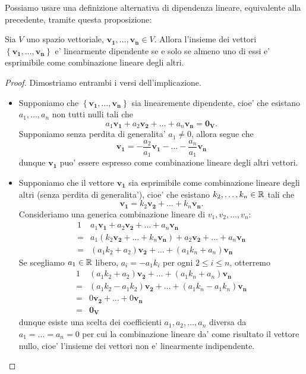 Possiamo usare una definizione alternativa di dipendenza lineare, equivalente alla precedente, tramite questa proposizione:
\begin{proposition}\label{dip_se_e'_comb_lin}
    Sia $V$ uno spazio vettoriale, $\bm{v_1}, \dots, \bm{v_n} \in V$. Allora l'insieme dei vettori $\left\{ \bm{v_1}, \dots, \bm{v_n} \right\}$ e' linearmente dipendente se e solo se almeno uno di essi e' esprimibile come combinazione lineare degli altri. 
\end{proposition}
\begin{proof}
    Dimostriamo entrambi i versi dell'implicazione.
    \begin{itemize}
        \item Supponiamo che $\left\{ \bm{v_1}, \dots, \bm{v_n} \right\}$ sia linearemente dipendente, cioe' che esistano $a_1, \dots, a_n$ non tutti nulli tali che \[
            a_1\bm{v_1} + a_2\bm{v_2} + \dots + a_n\bm{v_n} = \bm{0_V}   
        .\]
        Supponiamo senza perdita di generalita' $a_1 \neq 0$, allora segue che \[
            \bm{v_1} = -\frac{a_2}{a_1}\bm{v_1} - \dots - \frac{a_n}{a_1}\bm{v_n}
        \]
        dunque $\bm{v_1}$ puo' essere espresso come combinazione lineare degli altri vettori.
        \item Supponiamo che il vettore $\bm{v_1}$ sia esprimibile come combinazione lineare degli altri (senza perdita di generalita'), cioe' che esistano $k_2, \dots, k_n \in \mathbb{R}$ tali che \[
            \bm{v_1} = k_2\bm{v_2} + \dots + k_n\bm{v_n}
        .\]
        Consideriamo una generica combinazione lineare di $v_1, v_2, \dots, v_n$:
        \begin{alignat*}
            {1}
            & a_1\bm{v_1} + a_2\bm{v_2} + \dots + a_n\bm{v_n} \\
            = & a_1(k_2\bm{v_2} + \dots + k_n\bm{v_n}) + a_2\bm{v_2} + \dots + a_n\bm{v_n} \\
            = & (a_1k_2 + a_2)\bm{v_2} + \dots + (a_1k_n + a_n)\bm{v_n}
        \end{alignat*}
        Se scegliamo $a_1 \in \mathbb{R}$ libero, $a_i = -a_1k_i$ per ogni $2 \leq i \leq n$, otterremo
        \begin{alignat*}{1}
            & (a_1k_2 + a_2)\bm{v_2} + \dots + (a_1k_n + a_n)\bm{v_n} \\
            = & (a_1k_2 - a_1k_2)\bm{v_2} + \dots + (a_1k_n - a_1k_n)\bm{v_n} \\
            = & 0\bm{v_2} + \dots + 0\bm{v_n} \\
            = & \bm{0_V}
        \end{alignat*}
        dunque esiste una scelta dei coefficienti $a_1, a_2, \dots, a_n$ diversa da $a_1 = \dots = a_n = 0$ per cui la combinazione lineare da' come risultato il vettore nullo, cioe' l'insieme dei vettori non e' linearmente indipendente. \qedhere
    \end{itemize}
\end{proof}

